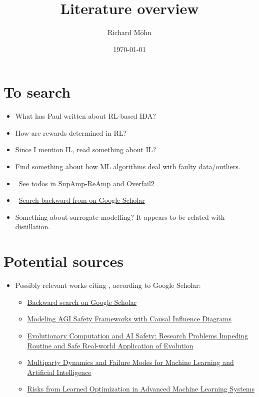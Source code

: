 \documentclass{farlamp}
\author{Richard Möhn}
\date{\today}
\title{Literature overview}
\begin{document}
\maketitle
\tableofcontents

\section{To search}

\begin{itemize}
    \item What has Paul written about RL-based IDA?
    \item How are rewards determined in RL?
    \item Since I mention IL, read something about IL?
    \item Find something about how ML algorithms deal with faulty data/outliers.
    \item \done\ See todos in SupAmp-ReAmp and Overfail2
    \item \done\ \href{https://scholar.google.com/scholar?hl=en&as_sdt=0%2C5&q=supervising+strong+learners+by+amplifying+weak+experts&btnG=}{Search
        backward from \textcite{CSASupAmp} on Google Scholar}
    \item Something about surrogate modelling? It appears to be related with
        distillation.
\end{itemize}


\section{Potential sources}

\begin{itemize}
    \item Possibly relevant works citing \textcite{CSASupAmp}, according to
        Google Scholar:
        \begin{itemize}
            \item \href{https://scholar.google.com/scholar?hl=en&as_sdt=0%2C5&q=supervising+strong+learners+by+amplifying+weak+experts&btnG=}{Backward search on Google Scholar}
            \item \href{https://arxiv.org/abs/1906.08663}{Modeling AGI Safety Frameworks
                with Causal Influence Diagrams}
            \item \href{https://arxiv.org/abs/1906.10189}{Evolutionary
                Computation and AI Safety: Research Problems Impeding Routine
                and Safe Real-world Application of Evolution}
            \item \href{https://www.mdpi.com/2504-2289/3/2/21}{Multiparty
                Dynamics and Failure Modes for Machine Learning and Artificial
                Intelligence}
            \item \href{https://arxiv.org/abs/1906.01820}{Risks from Learned Optimization in Advanced Machine Learning Systems}
        \end{itemize}
\end{itemize}
\end{document}
